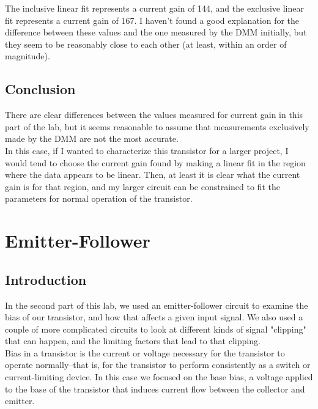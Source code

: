 \documentclass[11pt]{article}
\begin{document}
The inclusive linear fit represents a current gain of 144, and the exclusive linear fit represents a current gain of 167. I haven't found a good explanation for the difference between these values and the one measured by the DMM initially, but they seem to be reasonably close to each other (at least, within an order of magnitude).\\

\subsection{Conclusion}

There are clear differences between the values measured for current gain in this part of the lab, but it seems reasonable to assume that measurements exclusively made by the DMM are not the most accurate.\\

In this case, if I wanted to characterize this transistor for a larger project, I would tend to choose the current gain found by making a linear fit in the region where the data appears to be linear. Then, at least it is clear what the current gain is for that region, and my larger circuit can be constrained to fit the parameters for normal operation of the transistor.\\
    

\section{Emitter-Follower}
\subsection{Introduction}

In the second part of this lab, we used an emitter-follower circuit to examine the bias of our transistor, and how that affects a given input signal. We also used a couple of more complicated circuits to look at different kinds of signal "clipping" that can happen, and the limiting factors that lead to that clipping.\\

Bias in a transistor is the current or voltage necessary for the transistor to operate normally--that is, for the transistor to perform consistently as a switch or current-limiting device. In this case we focused on the base bias, a voltage applied to the base of the transistor that induces current flow between the collector and emitter.\\
\end{document}
